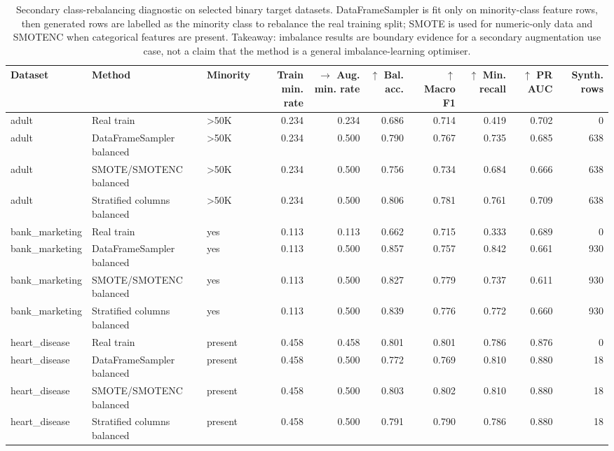 \begin{table}
\caption{Secondary class-rebalancing diagnostic on selected binary target datasets. DataFrameSampler is fit only on minority-class feature rows, then generated rows are labelled as the minority class to rebalance the real training split; SMOTE is used for numeric-only data and SMOTENC when categorical features are present. Takeaway: imbalance results are boundary evidence for a secondary augmentation use case, not a claim that the method is a general imbalance-learning optimiser.}
\label{tab:imbalance-validation}
\begin{adjustbox}{max width=\textwidth}
\begin{tabular}{lllrrrrrrr}
\toprule
Dataset & Method & Minority & Train min. rate & $\rightarrow$ Aug. min. rate & $\uparrow$ Bal. acc. & $\uparrow$ Macro F1 & $\uparrow$ Min. recall & $\uparrow$ PR AUC & Synth. rows \\
\midrule
adult & Real train & >50K & 0.234 & 0.234 & 0.686 & 0.714 & 0.419 & 0.702 & 0 \\
adult & DataFrameSampler balanced & >50K & 0.234 & 0.500 & 0.790 & 0.767 & 0.735 & 0.685 & 638 \\
adult & SMOTE/SMOTENC balanced & >50K & 0.234 & 0.500 & 0.756 & 0.734 & 0.684 & 0.666 & 638 \\
adult & Stratified columns balanced & >50K & 0.234 & 0.500 & 0.806 & 0.781 & 0.761 & 0.709 & 638 \\
bank\_marketing & Real train & yes & 0.113 & 0.113 & 0.662 & 0.715 & 0.333 & 0.689 & 0 \\
bank\_marketing & DataFrameSampler balanced & yes & 0.113 & 0.500 & 0.857 & 0.757 & 0.842 & 0.661 & 930 \\
bank\_marketing & SMOTE/SMOTENC balanced & yes & 0.113 & 0.500 & 0.827 & 0.779 & 0.737 & 0.611 & 930 \\
bank\_marketing & Stratified columns balanced & yes & 0.113 & 0.500 & 0.839 & 0.776 & 0.772 & 0.660 & 930 \\
heart\_disease & Real train & present & 0.458 & 0.458 & 0.801 & 0.801 & 0.786 & 0.876 & 0 \\
heart\_disease & DataFrameSampler balanced & present & 0.458 & 0.500 & 0.772 & 0.769 & 0.810 & 0.880 & 18 \\
heart\_disease & SMOTE/SMOTENC balanced & present & 0.458 & 0.500 & 0.803 & 0.802 & 0.810 & 0.880 & 18 \\
heart\_disease & Stratified columns balanced & present & 0.458 & 0.500 & 0.791 & 0.790 & 0.786 & 0.880 & 18 \\

\end{tabular}
\end{adjustbox}
\end{table}
